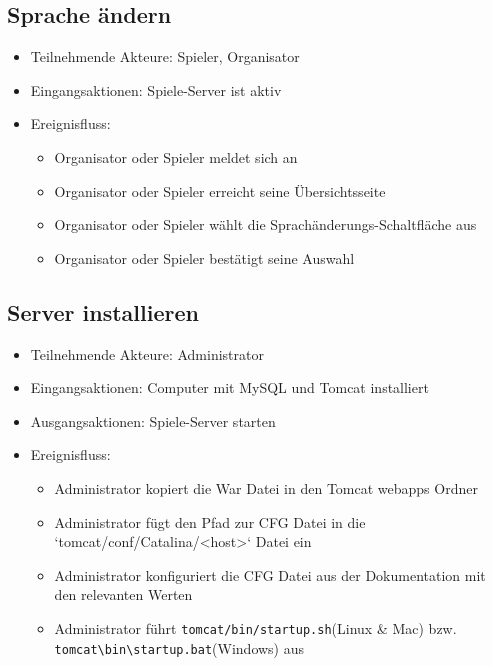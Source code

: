 \documentclass[a4paper]{scrreprt}
\begin{document}
     \subsection{Sprache ändern}
    \begin{itemize}
    \item Teilnehmende Akteure: \Gls{Spieler}, \Gls{Organisator}
    \item Eingangsaktionen: Spiele-Server ist aktiv
    \item Ereignisfluss:
        \begin{itemize}
            \item Organisator oder Spieler meldet sich an
            \item Organisator oder Spieler erreicht seine Übersichtsseite
            \item Organisator oder Spieler wählt die Sprachänderungs-Schaltfläche aus
            \item Organisator oder Spieler bestätigt seine Auswahl
        \end{itemize}
    \end{itemize}
    \subsection{Server installieren}
    \begin{itemize}
        \item Teilnehmende Akteure: \Gls{Administrator} 
        \item Eingangsaktionen: Computer mit MySQL und Tomcat installiert
        \item Ausgangsaktionen: Spiele-Server starten
        \item Ereignisfluss: 
            \begin{itemize}
                \item Administrator kopiert die War Datei in den Tomcat webapps Ordner
                \item Administrator fügt den Pfad zur CFG Datei in die `tomcat/conf/Catalina/<host>` Datei ein
                \item Administrator konfiguriert die CFG Datei aus der Dokumentation mit den relevanten Werten
                \item Administrator führt \texttt{tomcat/bin/startup.sh}(Linux \& Mac) bzw. \texttt{tomcat\textbackslash bin\textbackslash startup.bat}(Windows) aus
            \end{itemize}
    \end{itemize}
\end{document}
